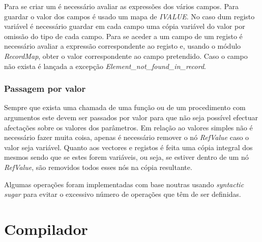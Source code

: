 Para se criar um é necessário avaliar as expressões dos vários campos. Para 
guardar o valor dos campos é usado um mapa de \emph{IVALUE}. No caso dum 
registo variável é necessário guardar em cada campo uma cópia variável do valor 
por omissão do tipo de cada campo.
Para se aceder a um campo de um registo é necessário avaliar a expressão 
correspondente ao registo e, usando o módulo \emph{RecordMap}, obter o valor 
correspondente ao campo pretendido. Caso o campo não exista é lançada a 
excepção \emph{Element\_not\_found\_in\_record}.

\subsubsection{Passagem por valor}

Sempre que exista uma chamada de uma função ou de um procedimento com 
argumentos este devem ser passados por valor para que não seja possível 
efectuar afectações sobre os valores dos parâmetros. Em relação ao valores 
simples não é necessário fazer muita coisa, apenas é necessário remover o nó 
\emph{RefValue} caso o valor seja variável. Quanto aos vectores e registos é 
feita uma cópia integral dos mesmos sendo que se estes forem variáveis, ou 
seja, se estiver dentro de um nó \emph {RefValue}, são removidos todos esses 
nós na cópia resultante. 

\vspace{\baselineskip}

Algumas operações foram implementadas com base noutras usando \emph{syntactic 
sugar} para evitar o excessivo número de operações que têm de ser definidas.

\newpage
\section{Compilador}

